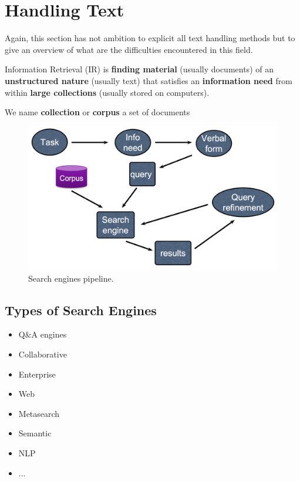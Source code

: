 

\section{Handling Text}

Again, this section has not ambition to explicit all text handling methods but to give an overview of what are the difficulties encountered in this field.

Information Retrieval (IR) is \textbf{finding material} (usually documents) of an \textbf{unstructured nature} (usually text) that satisfies an \textbf{information need} from within \textbf{large collections} (usually stored on computers).

We name {\bf collection} or {\bf corpus} a set of documents

\begin{figure}[H]%
 \centering
 \includegraphics[width=13cm]{./img/11/SE_pipeline}
 \caption{\label{pic:SE_pipline} Search engines pipeline.}
\end{figure}

\subsection{Types of Search Engines}

\begin{itemize}
	\item Q\&A engines
	\item Collaborative
	\item Enterprise
	\item Web
	\item Metasearch
	\item Semantic
	\item NLP
	\item ...
\end{itemize}


